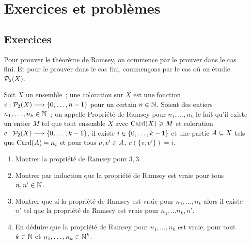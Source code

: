 \clearpage

\section{Exercices et problèmes}

\subsection{Exercices}

\begin{exercise}\label{exo.Ramsey}
  Pour prouver le théorème de Ramsey, on commence par le prouver dans le cas
  fini. Et pour le prouver dans le cas fini, commençons par le cas où on étudie
  $\mathcal{P}_2(X)$.
  
  Soit $X$ un ensemble~; une coloration sur $X$ est une fonction
  $c : \displaystyle \mathcal{P}_2(X) \longrightarrow \{0,\ldots,n - 1\}$ pour un certain $n \in \mathbb N$.
  Soient des entiers $n_1,\ldots,n_k \in \mathbb N$~; on appelle
  \og Propriété de Ramsey pour $n_1,\ldots,n_k$\fg{} le fait qu'il existe un
  entier $M$ tel que tout ensemble $X$ avec $\operatorname{Card}(X) \geqslant M$ et coloration
  $c : \displaystyle \mathcal{P}_2(X) \longrightarrow \{0,\ldots,k - 1\}$, il existe
  $i \in \{0,\ldots,k - 1\}$ et une partie $A\subseteq X$ tels que
  $\operatorname{Card}(A) = n_i$ et pour tous $v,v'\in A$, $c(\{v,v'\}) = i$.
  \begin{enumerate}[label=(\roman*)]
  \item Montrer la propriété de Ramsey pour $3,3$.
  \item Montrer par induction que la propriété de Ramsey est vraie pour tous
    $n,n' \in \mathbb N$.
  \item Montrer que si la propriété de Ramsey est vraie pour
    $n_1,\ldots,n_k$ alors il existe $n'$ tel que la propriété de Ramsey est
    vraie pour $n_1,\ldots n_k,n'$.
  \item En déduire que la propriété de Ramsey pour $n_1,\ldots,n_k$ est vraie,
    pour tout $k \in \mathbb N$ et $n_1,\ldots,n_k\in\mathbb N^k$.
  \end{enumerate}


\end{exercise}
